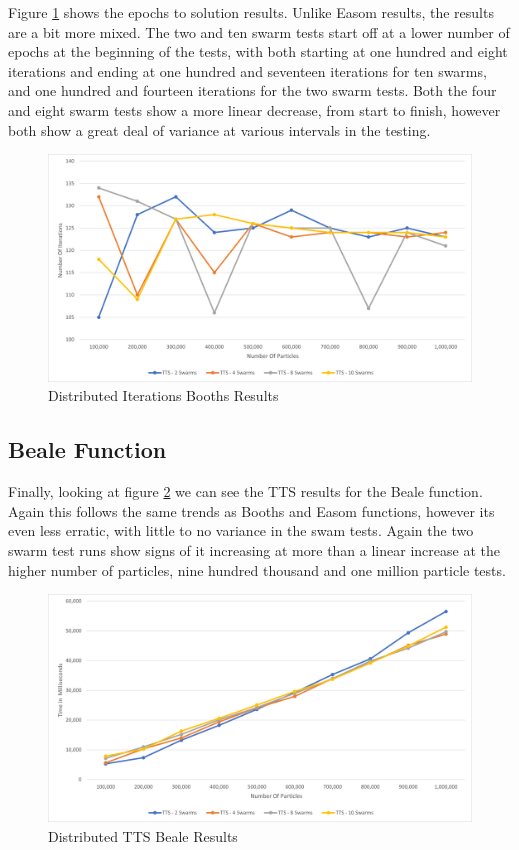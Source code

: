 \documentclass[oneside,12pt]{book}
\begin{document}
Figure \ref{fig:Distributed_Epoc_Booths_Results} shows the epochs to solution results. Unlike Easom results, the results are a bit more mixed. The two and ten swarm tests start off at a lower number of epochs at the beginning of the tests, with both starting at one hundred and eight iterations and ending at one hundred and seventeen iterations for ten swarms, and one hundred and fourteen iterations for the two swarm tests. Both the four and eight swarm tests show a more linear decrease, from start to finish, however both show a great deal of variance at various intervals in the testing. 

\begin{figure}[H]
    \centering
    \includegraphics[scale=0.45]{Images/Graphs/DistributedBoothsEpoch.png}
    \caption{Distributed Iterations Booths Results}
    \label{fig:Distributed_Epoc_Booths_Results}
\end{figure}

\subsection{Beale Function}
Finally, looking at figure \ref{fig:Distributed_TTS_Beale_Results} we can see the TTS results for the Beale function. Again this follows the same trends as Booths and Easom functions, however its even less erratic, with little to no variance in the swam tests. Again the two swarm test runs show signs of it increasing at more than a linear increase at the higher number of particles, nine hundred thousand and one million particle tests. 
\begin{figure}[H]
    \centering
    \includegraphics[scale=0.45]{Images/Graphs/DistributedBealeTTS.png}
    \caption{Distributed TTS Beale Results}
    \label{fig:Distributed_TTS_Beale_Results}
\end{figure}
\end{document}
